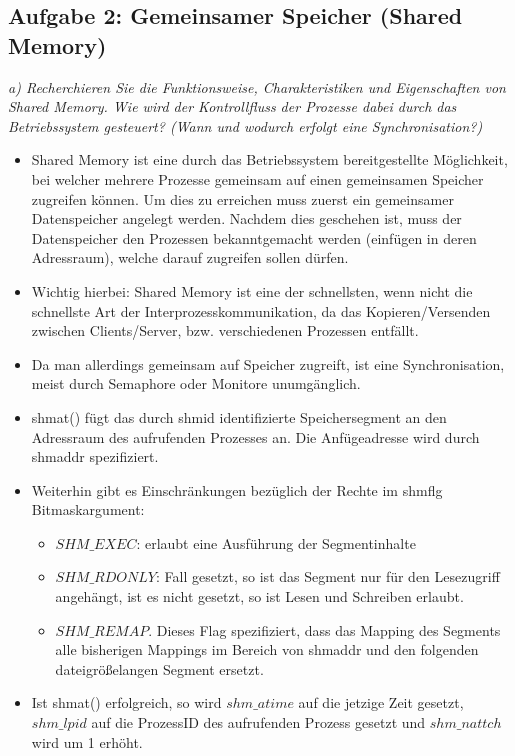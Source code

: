 \documentclass[a4paper]{article}
\begin{document}
\subsection{Aufgabe 2: Gemeinsamer Speicher (Shared Memory)}
\textit{a) Recherchieren Sie die Funktionsweise, Charakteristiken und Eigenschaften von Shared Memory. Wie wird der Kontrollfluss der Prozesse dabei durch das Betriebssystem gesteuert? (Wann und wodurch erfolgt eine Synchronisation?)}
\vspace{10mm}
\begin{itemize}
    \item Shared Memory ist eine durch das Betriebssystem bereitgestellte Möglichkeit, bei welcher mehrere Prozesse gemeinsam auf einen gemeinsamen Speicher zugreifen können. Um dies zu erreichen muss zuerst ein gemeinsamer Datenspeicher angelegt werden. Nachdem dies geschehen ist, muss der Datenspeicher den Prozessen bekanntgemacht werden (einfügen in deren Adressraum), welche darauf zugreifen sollen dürfen.
    \item Wichtig hierbei: Shared Memory ist eine der schnellsten, wenn nicht die schnellste Art der Interprozesskommunikation, da das Kopieren/Versenden zwischen Clients/Server, bzw. verschiedenen Prozessen entfällt.
    \item Da man allerdings gemeinsam auf Speicher zugreift, ist eine Synchronisation, meist durch Semaphore oder Monitore unumgänglich.
    \item shmat() fügt das durch shmid identifizierte Speichersegment an den Adressraum des aufrufenden Prozesses an. Die Anfügeadresse wird durch shmaddr spezifiziert.
    \item Weiterhin gibt es Einschränkungen bezüglich der Rechte im shmflg Bitmaskargument:
          \begin{itemize}
              \item $SHM\_EXEC$: erlaubt eine Ausführung der Segmentinhalte
              \item $SHM\_RDONLY$: Fall gesetzt, so ist das Segment nur für den Lesezugriff angehängt, ist es nicht gesetzt, so ist Lesen und Schreiben erlaubt.
              \item $SHM\_REMAP$. Dieses Flag spezifiziert, dass das Mapping des Segments alle bisherigen Mappings im Bereich von shmaddr und den folgenden dateigrößelangen Segment ersetzt.
          \end{itemize}
    \item Ist shmat() erfolgreich, so wird $shm\_atime$ auf die jetzige Zeit gesetzt, $shm\_lpid$ auf die ProzessID des aufrufenden Prozess gesetzt und $shm\_nattch$ wird um 1 erhöht.
\end{itemize}
\end{document}
